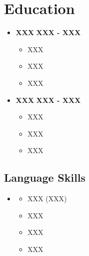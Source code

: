\documentclass{report} %
\begin{document}
\section*{Education}
\small
\begin{itemize}
    \item{\small \textbf{XXX}} %
    \newline \footnotesize \textbf{XXX - XXX} %
    \begin{itemize}
        \small
        \item XXX %
        \item XXX
        \item XXX
    \end{itemize}
\end{itemize}
\vspace{3mm} %
\begin{itemize}
    \item{\small \textbf{XXX}} %
    \newline \footnotesize \textbf{XXX - XXX} %
    \begin{itemize}
        \small
        \item XXX %
        \item XXX
        \item XXX
    \end{itemize}
\end{itemize}\par


\newpage %
\subsection*{Language Skills}
\small
\begin{itemize}
    \item[] 
    \begin{itemize}
        \item XXX (XXX) %
        \item XXX
        \item XXX
        \item XXX
    \end{itemize}
\end{itemize}
\thispagestyle{empty} %
\end{document}

